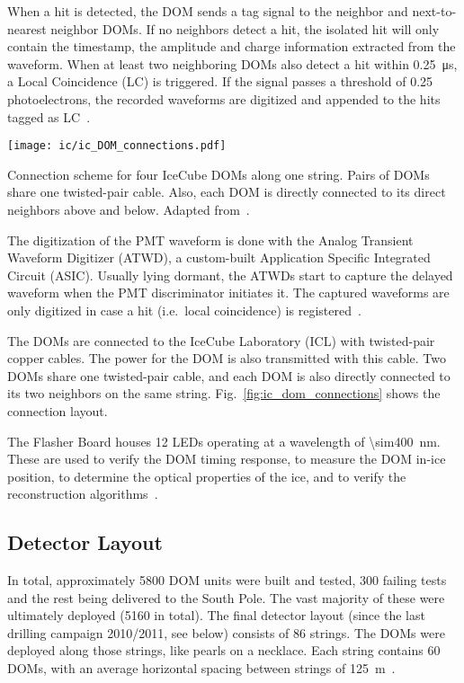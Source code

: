 When a hit is detected, the DOM sends a tag signal to the neighbor and next-to-nearest neighbor DOMs. If no neighbors detect a hit, the isolated hit will only contain the timestamp, the amplitude and charge information extracted from the waveform. When at least two neighboring DOMs also detect a hit within \SI{0.25}{\micro\s}, a Local Coincidence (LC) is triggered. If the signal passes a threshold of 0.25 photoelectrons, the recorded waveforms are digitized and appended to the hits tagged as LC~\cite{Aartsen2017}.

\begin{marginfigure}
    \texttt{[image: ic/ic\_DOM\_connections.pdf]}
    \caption[IceCube DOM connections]{Connection scheme for four IceCube DOMs along one string. Pairs of DOMs share one twisted-pair cable. Also, each DOM is directly connected to its direct neighbors above and below. Adapted from~\cite{Aartsen2017}.}
\end{marginfigure}

The digitization of the PMT waveform is done with the Analog Transient Waveform Digitizer (ATWD), a custom-built Application Specific Integrated Circuit (ASIC). Usually lying dormant, the ATWDs start to capture the delayed waveform when the PMT discriminator initiates it. The captured waveforms are only digitized in case a hit (i.e.\ local coincidence) is registered~\cite{Aartsen2017}.

The DOMs are connected to the IceCube Laboratory (ICL) with twisted-pair copper cables. The power for the DOM is also transmitted with this cable. Two DOMs share one twisted-pair cable, and each DOM is also directly connected to its two neighbors on the same string. Fig.~\ref{fig:ic_dom_connections} shows the connection layout.

The Flasher Board houses 12 LEDs operating at a wavelength of \SI{\sim400}{\nm}. These are used to verify the DOM timing response, to measure the DOM in-ice position, to determine the optical properties of the ice, and to verify the reconstruction algorithms~\cite{Aartsen2017}.

\subsection{Detector Layout}
In total, approximately 5800 DOM units were built and tested, 300 failing tests and the rest being delivered to the South Pole. The vast majority of these were ultimately deployed (5160 in total). The final detector layout (since the last drilling campaign 2010/2011, see below) consists of 86 strings. The DOMs were deployed along those strings, like pearls on a necklace. Each string contains 60 DOMs, with an average horizontal spacing between strings of \SI{125}{\meter}~\cite{Aartsen2017}.

